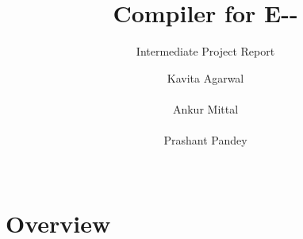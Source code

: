 \documentclass{sigchi}
\begin{document}
\title{Compiler for E-{}-}
\subtitle{Intermediate Project Report}

\author{
  \alignauthor Kavita Agarwal\\
   \\
  \alignauthor Ankur Mittal\\
    \\
  \alignauthor Prashant Pandey\\
    \\
}

\maketitle


\section{Overview}
\end{document}
